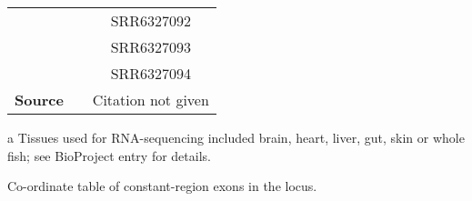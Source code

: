 \begin{table}
\begin{threeparttable}
\begin{tabular}{>{\bfseries}c|c|c}
&&SRR6327092\\
&&SRR6327093\\
&&SRR6327094\\\midrule
Source & \parencite{smith2017microbiota} & Citation not given\\
\bottomrule\end{tabular} %
	\begin{tablenotes}
	\item[a] Tissues used for \Xma RNA-sequencing included brain, heart, liver, gut, skin or whole fish; see BioProject entry for details.
	\end{tablenotes}
\end{threeparttable}
\label{tab:rnaseq-sources}
\end{table}

\centering

\begin{table}\centering
    \caption{Co-ordinate table of constant-region exons in the \nfu \igh{} locus.}
    	
    \label{tab:nfu-ch-coords}
\end{table}

    \begin{landscape}
        \centering
        \vspace*{\fill}
        \scriptsize
		
		\normalsize\vspace{1em}
        \label{tab:nfu-vh-coords}
        \vspace*{\fill}
    \end{landscape}

        {\centering
        \vspace{-0.3em}
        \label{tab:nfu-dh-coords-seg}
        \scriptsize
		
		\normalsize\vspace{1em}
        \vspace{-0.3em}
        \label{tab:nfu-dh-coords-rss5}
        \scriptsize
        	
        	\normalsize\vspace{1em}
        \vspace{-0.3em}
        \label{tab:nfu-dh-coords-rss3}
        \scriptsize
		
		\normalsize
		}

